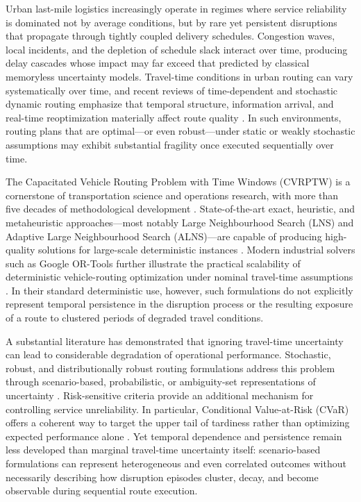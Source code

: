 \documentclass[preprint,12pt]{elsarticle}
\newcommand{\1}{\mathbf{1}}
\begin{document}
Urban last-mile logistics increasingly operate in regimes where service reliability
is dominated not by average conditions, but by rare yet persistent disruptions that
propagate through tightly coupled delivery schedules.
Congestion waves, local incidents, and the depletion of schedule slack interact over time,
producing delay cascades whose impact may far exceed that predicted by classical
memoryless uncertainty models.
Travel-time conditions in urban routing can vary systematically over time, and recent
reviews of time-dependent and stochastic dynamic routing emphasize that temporal structure,
information arrival, and real-time reoptimization materially affect route quality
\citep{Ritzinger2016, ZhangVanWoensel2023, Adamo2024, Mardesic2024}.
In such environments, routing plans that are optimal---or even robust---under static or
weakly stochastic assumptions may exhibit substantial fragility once executed
sequentially over time.

The Capacitated Vehicle Routing Problem with Time Windows (CVRPTW) is a cornerstone of
transportation science and operations research, with more than five decades of
methodological development
\citep{Solomon1987, TothVigo2002, Laporte2009}.
State-of-the-art exact, heuristic, and metaheuristic approaches---most notably Large
Neighbourhood Search (LNS) and Adaptive Large Neighbourhood Search (ALNS)---are capable of
producing high-quality solutions for large-scale deterministic instances
\citep{BraysyGendreau2005, Ropke2006ALNS, Christiaens2020SurveyVRPTW}.
Modern industrial solvers such as Google OR-Tools further illustrate the practical
scalability of deterministic vehicle-routing optimization under nominal travel-time
assumptions \citep{ortools2023}.
In their standard deterministic use, however, such formulations do not explicitly
represent temporal persistence in the disruption process or the resulting exposure of a
route to clustered periods of degraded travel conditions.

A substantial literature has demonstrated that ignoring travel-time uncertainty can lead
to considerable degradation of operational performance.
Stochastic, robust, and distributionally robust routing formulations address this problem
through scenario-based, probabilistic, or ambiguity-set representations of uncertainty
\citep{Ritzinger2016, ZhangEtAl2021DRODeadlines, Mardesic2024}.
Risk-sensitive criteria provide an additional mechanism for controlling service
unreliability.
In particular, Conditional Value-at-Risk (CVaR) offers a coherent way to target the upper
tail of tardiness rather than optimizing expected performance alone
\citep{RockafellarUryasev2000}.
Yet temporal dependence and persistence remain less developed than marginal travel-time
uncertainty itself: scenario-based formulations can represent heterogeneous and even
correlated outcomes without necessarily describing how disruption episodes cluster,
decay, and become observable during sequential route execution.
\end{document}
